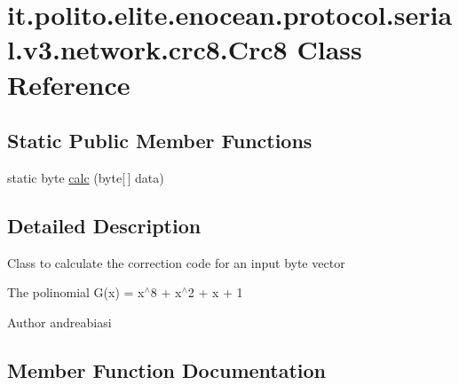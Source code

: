 \hypertarget{classit_1_1polito_1_1elite_1_1enocean_1_1protocol_1_1serial_1_1v3_1_1network_1_1crc8_1_1_crc8}{}\section{it.\+polito.\+elite.\+enocean.\+protocol.\+serial.\+v3.\+network.\+crc8.\+Crc8 Class Reference}
\label{classit_1_1polito_1_1elite_1_1enocean_1_1protocol_1_1serial_1_1v3_1_1network_1_1crc8_1_1_crc8}
\subsection*{Static Public Member Functions}
\begin{DoxyCompactItemize}
\item 
static byte \hyperlink{classit_1_1polito_1_1elite_1_1enocean_1_1protocol_1_1serial_1_1v3_1_1network_1_1crc8_1_1_crc8_a906ac1d7c0b09dc52ec184b0a5a657fe}{calc} (byte\mbox{[}$\,$\mbox{]} data)
\end{DoxyCompactItemize}


\subsection{Detailed Description}
Class to calculate the correction code for an input byte vector

The polinomial G(x) = x$^\wedge$8 + x$^\wedge$2 + x + 1

\begin{DoxyAuthor}{Author}
andreabiasi 
\end{DoxyAuthor}


\subsection{Member Function Documentation}
\hypertarget{classit_1_1polito_1_1elite_1_1enocean_1_1protocol_1_1serial_1_1v3_1_1network_1_1crc8_1_1_crc8_a906ac1d7c0b09dc52ec184b0a5a657fe}{}\label{classit_1_1polito_1_1elite_1_1enocean_1_1protocol_1_1serial_1_1v3_1_1network_1_1crc8_1_1_crc8_a906ac1d7c0b09dc52ec184b0a5a657fe} 
